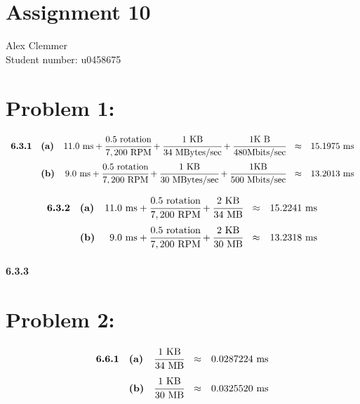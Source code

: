 \documentclass[a4paper]{article}
\begin{document}
\section*{Assignment 10}
Alex Clemmer\\
Student number: u0458675

\section*{Problem 1:}

\begin{equation}
\begin{array}{llrll}
\textbf{6.3.1} & \textbf{(a)} & 11.0 \mbox{ ms} + \cfrac{0.5 \mbox{ rotation}}{7,200 \mbox{ RPM}} + \cfrac{1 \mbox{ KB}}{34 \mbox{ MBytes/sec}} + \cfrac{1 \mbox{K B}}{480 \mbox{Mbits/sec}} & \approx & 15.1975 \mbox{ ms} \\[.15in]
& \textbf{(b)} & 9.0 \mbox{ ms} + \cfrac{0.5 \mbox{ rotation}}{7,200 \mbox{ RPM}} + \cfrac{1 \mbox{ KB}}{30 \mbox{ MBytes/sec}} + \cfrac{1 \mbox{KB}}{500 \mbox{ Mbits/sec}} & \approx & 13.2013 \mbox{ ms}
\end{array}
\end{equation}

\begin{equation}
\begin{array}{llrll}
\textbf{6.3.2} & \textbf{(a)} & 11.0 \mbox{ ms} + \cfrac{0.5 \mbox{ rotation}}{7,200 \mbox{ RPM}} + \cfrac{2 \mbox{ KB}}{34 \mbox{ MB}} & \approx & 15.2241 \mbox{ ms} \\[.15in]
& \textbf{(b)} & 9.0 \mbox{ ms} + \cfrac{0.5 \mbox{ rotation}}{7,200 \mbox{ RPM}} + \cfrac{2 \mbox{ KB}}{30 \mbox{ MB}} & \approx & 13.2318 \mbox{ ms}
\end{array}
\end{equation}

\paragraph{6.3.3} 

\section*{Problem 2:}

\begin{equation}
\begin{array}{llrll}
\textbf{6.6.1} & \textbf{(a)} & \cfrac{1 \mbox{ KB}}{34 \mbox{ MB}} & \approx & 0.0287224 \mbox{ ms} \\[.15in]
& \textbf{(b)} & \cfrac{1 \mbox{ KB}}{30 \mbox{ MB}} & \approx & 0.0325520 \mbox{ ms}
\end{array}
\end{equation}
\end{document}
